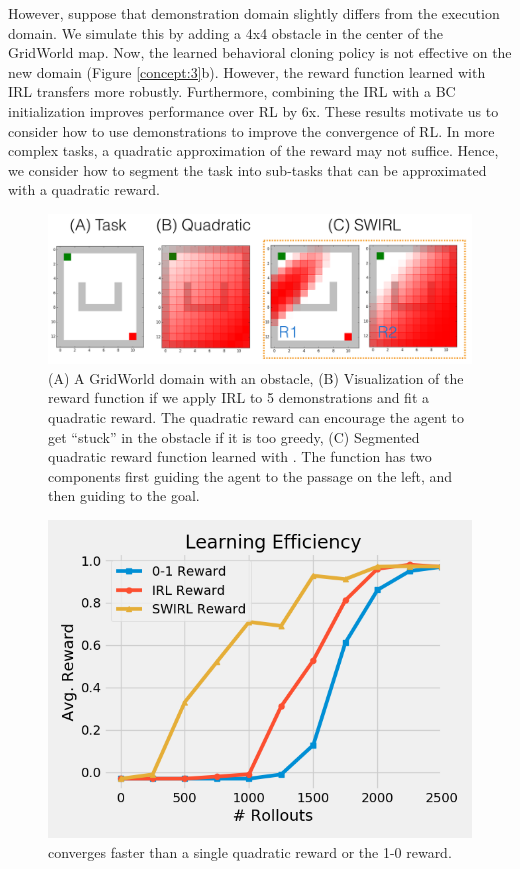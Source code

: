 However, suppose that demonstration domain slightly differs from the execution domain. We simulate this by adding a 4x4 obstacle in the center of the GridWorld map.
Now, the learned behavioral cloning policy is not effective on the new domain (Figure \ref{concept:3}b).
However, the reward function learned with IRL transfers more robustly.
Furthermore, combining the IRL with a BC initialization improves performance over RL by 6x.
These results motivate us to consider how to use demonstrations to improve the convergence of RL.
In more complex tasks, a quadratic approximation of the reward may not suffice.
Hence, we consider how to segment the task into sub-tasks that can be approximated with a quadratic reward.


\begin{figure}[t]
\centering
 \includegraphics[width=\columnwidth]{concept/swirl-rewards.png}
 \caption{(A) A GridWorld domain with an obstacle, (B) Visualization of the reward function if we apply IRL to 5 demonstrations and fit a quadratic reward. The quadratic reward can encourage the agent to get ``stuck'' in the obstacle if it is too greedy, (C) Segmented quadratic reward function learned with \hirl. The function has two components first guiding the agent to the passage on the left, and then guiding to the goal.  \label{concept:4}}
\end{figure}

\begin{figure}[t]
\centering
 \includegraphics[width=0.6\columnwidth]{concept/2-1.png}
 \caption{\hirl converges faster than a single quadratic reward or the 1-0 reward. \label{concept:5}}
\end{figure}


